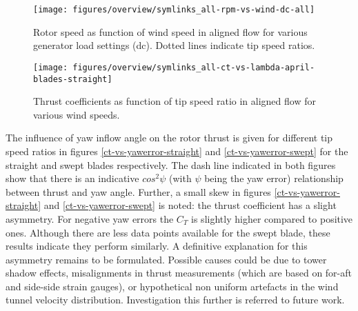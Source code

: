 \documentclass[a4paper]{jpconf}
\begin{document}
\begin{figure}[h]
\begin{minipage}{17pc}
\vspace{10px}
\texttt{[image: figures/overview/symlinks\_all-rpm-vs-wind-dc-all]}
\caption{\label{rpm-vs-wind} Rotor speed as function of wind speed in aligned flow for various generator load settings (dc). Dotted lines indicate tip speed ratios.}
\end{minipage}\hspace{3pc}%
\begin{minipage}{17pc}
\texttt{[image: figures/overview/symlinks\_all-ct-vs-lambda-april-blades-straight]}
\caption{\label{ct-vs-lambda} Thrust coefficients as function of tip speed ratio in aligned flow for various wind speeds.}
\end{minipage} 
\end{figure}


The influence of yaw inflow angle on the rotor thrust is given for different tip speed ratios in figures \ref{ct-vs-yawerror-straight} and \ref{ct-vs-yawerror-swept} for the straight and swept blades respectively. The dash line indicated in both figures show that there is an indicative $cos^2 \psi$ (with $\psi$ being the yaw error) relationship between thrust and yaw angle. Further, a small skew in figures \ref{ct-vs-yawerror-straight} and \ref{ct-vs-yawerror-swept} is noted: the thrust coefficient has a slight asymmetry. For negative yaw errors the $C_T$ is slightly higher compared to positive ones. Although there are less data points available for the swept blade, these results indicate they perform similarly. A definitive explanation for this asymmetry remains to be formulated. Possible causes could be due to tower shadow effects, misalignments in thrust measurements (which are based on for-aft and side-side strain gauges), or hypothetical non uniform artefacts in the wind tunnel velocity distribution. Investigation this further is referred to future work.

\end{document}
